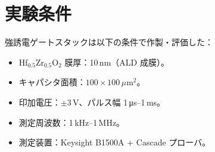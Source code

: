 \section*{実験条件}
強誘電ゲートスタックは以下の条件で作製・評価した：
\begin{itemize}
  \item Hf$_{0.5}$Zr$_{0.5}$O$_2$ 膜厚：10\,nm（ALD 成膜）。
  \item キャパシタ面積：$100 \times 100$\,$\mu$m$^2$。
  \item 印加電圧：$\pm 3$\,V、パルス幅 1\,\si{\micro\second}--1\,ms。
  \item 測定周波数：1\,kHz--1\,MHz。
  \item 測定装置：Keysight B1500A + Cascade プローバ。
\end{itemize}
